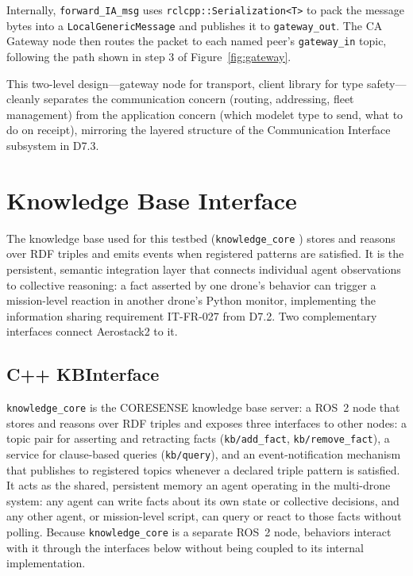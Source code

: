 \documentclass[deliverable]{csreport}
\renewcommand{\code}[1]{\texttt{\textcolor{CSMaroon}{#1}}}%
\begin{document}
Internally, \code{forward\_IA\_msg} uses \code{rclcpp::Serialization<T>} to pack the message bytes into a \code{LocalGenericMessage} and publishes it to \code{gateway\_out}. The CA Gateway node then routes the packet to each named peer's \code{gateway\_in} topic, following the path shown in step 3 of Figure~\ref{fig:gateway}.

This two-level design---gateway node for transport, client library for type safety---cleanly separates the communication concern (routing, addressing, fleet management) from the application concern (which modelet type to send, what to do on receipt), mirroring the layered structure of the Communication Interface subsystem in D7.3.


\chapter{Knowledge Base Interface}
\label{ch:kb}

The knowledge base used for this testbed (\code{knowledge\_core} \cite{knowledge_core}) stores and reasons over RDF triples and emits events when registered patterns are satisfied. It is the persistent, semantic integration layer that connects individual agent observations to collective reasoning: a fact asserted by one drone's behavior can trigger a mission-level reaction in another drone's Python monitor, implementing the information sharing requirement IT-FR-027 from D7.2. Two complementary interfaces connect Aerostack2 to it.

\section{C++ KBInterface}

\code{knowledge\_core} is the CORESENSE knowledge base server: a ROS~2 node that stores and reasons over RDF triples and exposes three interfaces to other nodes: a topic pair for asserting and retracting facts (\code{kb/add\_fact}, \code{kb/remove\_fact}), a service for clause-based queries (\code{kb/query}), and an event-notification mechanism that publishes to registered topics whenever a declared triple pattern is satisfied. It acts as the shared, persistent memory an agent operating in the multi-drone system: any agent can write facts about its own state or collective decisions, and any other agent, or mission-level script, can query or react to those facts without polling. Because \code{knowledge\_core} is a separate ROS~2 node, behaviors interact with it through the interfaces below without being coupled to its internal implementation.
\end{document}
